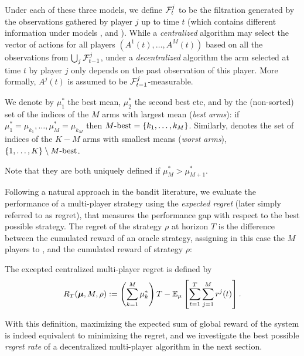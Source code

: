 Under each of these three models, we define $\mathcal{F}^j_t$ to be the filtration generated by the observations gathered by player $j$ up to time $t$ (which contains different information under models \modelun, \modeldeux{} and \modeltrois).
While a \emph{centralized} algorithm may select the vector of actions for all players $(A^1(t),\dots,A^M(t))$ based on all the observations from $\bigcup_j \mathcal{F}^j_{t-1}$, under a \emph{decentralized} algorithm the arm selected at time $t$ by player $j$ only depends on the past observation of this player.
More formally, $A^j(t)$ is assumed to be $\mathcal{F}^j_{t-1}$-measurable.

\begin{definition}\label{def:5:MbestMworst}
  We denote by $\mu_1^*$ the best mean, $\mu_2^*$ the second best etc, and
  by \Mbest{} the (non-sorted) set of the indices of the $M$ arms with largest mean (\emph{best arms}): if $\mu_1^* = \mu_{k_1}, \dots, \mu_M^* = \mu_{k_M}$
  then $M\text{-}\mathrm{best} = \{k_1, \dots, k_M\}$.
  Similarly, \Mworst{} denotes the set of indices of the $K-M$ arms with smallest means (\emph{worst arms}),
  $\{1, \dots, K\} \setminus M\text{-}\mathrm{best}$.

  Note that they are both uniquely defined if $\mu_M^* > \mu_{M+1}^*$.
\end{definition}

Following a natural approach in the bandit literature, we evaluate the performance of a multi-player strategy using the \emph{expected regret} (later simply referred to as regret), that measures the performance gap with respect to the best possible strategy.
The regret of the strategy $\rho$ at horizon $T$ is the difference between the cumulated reward of an oracle strategy, assigning in this case the $M$ players to \Mbest,
and the cumulated reward of strategy $\rho$:

\begin{definition}
  The excepted centralized multi-player regret is defined by
  \begin{equation}\label{eq:5:regret}
    R_T(\boldsymbol{\mu}, M, \rho) := \left(\sum_{k=1}^{M}\mu_k^*\right)T - \mathbb{E}_{\mu}\left[\sum_{t=1}^T\sum_{j=1}^M r^j(t)\right].
  \end{equation}
\end{definition}

With this definition, maximizing the expected sum of global reward of the system is indeed equivalent to minimizing the regret, and we investigate the best possible \emph{regret rate} of a decentralized multi-player algorithm in the next section.



